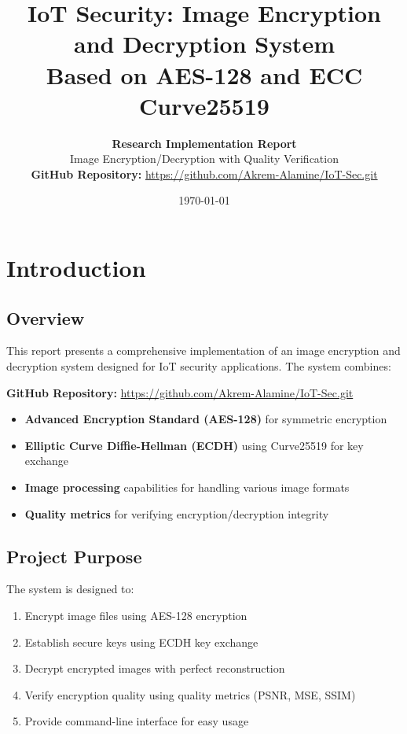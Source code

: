\documentclass[12pt,a4paper]{report}
\title{
    \textbf{IoT Security: Image Encryption and Decryption System}\\
    \large{Based on AES-128 and ECC Curve25519}
}
\author{
    \textbf{Research Implementation Report}\\
    Image Encryption/Decryption with Quality Verification\\
    \vspace{0.5cm}
    \textbf{GitHub Repository:} \url{https://github.com/Akrem-Alamine/IoT-Sec.git}
}
\date{\today}
\begin{document}
\maketitle

\tableofcontents
\newpage

\chapter{Introduction}

\section{Overview}

This report presents a comprehensive implementation of an image encryption and decryption system designed for IoT security applications. The system combines:

\textbf{GitHub Repository:} \url{https://github.com/Akrem-Alamine/IoT-Sec.git}

\begin{itemize}
    \item \textbf{Advanced Encryption Standard (AES-128)} for symmetric encryption
    \item \textbf{Elliptic Curve Diffie-Hellman (ECDH)} using Curve25519 for key exchange
    \item \textbf{Image processing} capabilities for handling various image formats
    \item \textbf{Quality metrics} for verifying encryption/decryption integrity
\end{itemize}

\section{Project Purpose}

The system is designed to:
\begin{enumerate}
    \item Encrypt image files using AES-128 encryption
    \item Establish secure keys using ECDH key exchange
    \item Decrypt encrypted images with perfect reconstruction
    \item Verify encryption quality using quality metrics (PSNR, MSE, SSIM)
    \item Provide command-line interface for easy usage
\end{enumerate}
\end{document}
